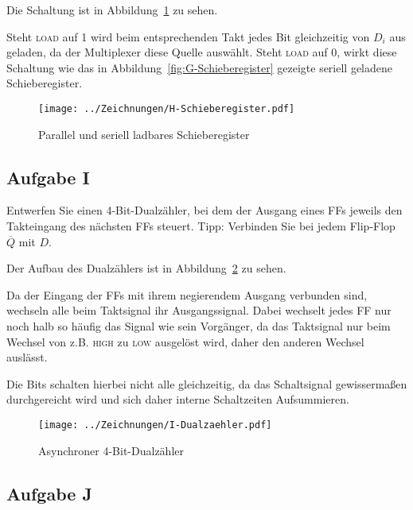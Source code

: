 Die Schaltung ist in Abbildung~\ref{fig:H-Schieberegister} zu sehen.

Steht \textsc{load} auf 1 wird beim entsprechenden Takt jedes Bit gleichzeitig
von $D_i$ aus geladen, da der Multiplexer diese Quelle auswählt. Steht
\textsc{load} auf 0, wirkt diese Schaltung wie das in
Abbildung~\ref{fig:G-Schieberegister} gezeigte seriell geladene Schieberegister.

\begin{figure}[htbp]
    \centering
    \texttt{[image: ../Zeichnungen/H-Schieberegister.pdf]}
    \caption{%
        Parallel und seriell ladbares Schieberegister
    }
    \label{fig:H-Schieberegister}
\end{figure}

\FloatBarrier
\subsection{Aufgabe I}

\begin{problem}
    Entwerfen Sie einen 4-Bit-Dualzähler, bei dem der Ausgang eines FFs jeweils
    den Takteingang des nächsten FFs steuert. Tipp: Verbinden Sie bei jedem
    Flip-Flop $\overline Q$ mit $D$.
\end{problem}

Der Aufbau des Dualzählers ist in Abbildung~\ref{fig:I-Dualzähler} zu sehen.

Da der Eingang der FFs mit ihrem negierendem Ausgang verbunden sind, wechseln
alle beim Taktsignal ihr Ausgangssignal. Dabei wechselt jedes FF nur noch halb
so häufig das Signal wie sein Vorgänger, da das Taktsignal nur beim Wechsel von
z.B. \textsc{high} zu \textsc{low} ausgelöst wird, daher den anderen Wechsel
auslässt.

Die Bits schalten hierbei nicht alle gleichzeitig, da das Schaltsignal
gewissermaßen durchgereicht wird und sich daher interne Schaltzeiten
Aufsummieren.

\begin{figure}[htbp]
    \centering
    \texttt{[image: ../Zeichnungen/I-Dualzaehler.pdf]}
    \caption{%
        Asynchroner 4-Bit-Dualzähler
    }
    \label{fig:I-Dualzähler}
\end{figure}

\FloatBarrier
\subsection{Aufgabe J}

